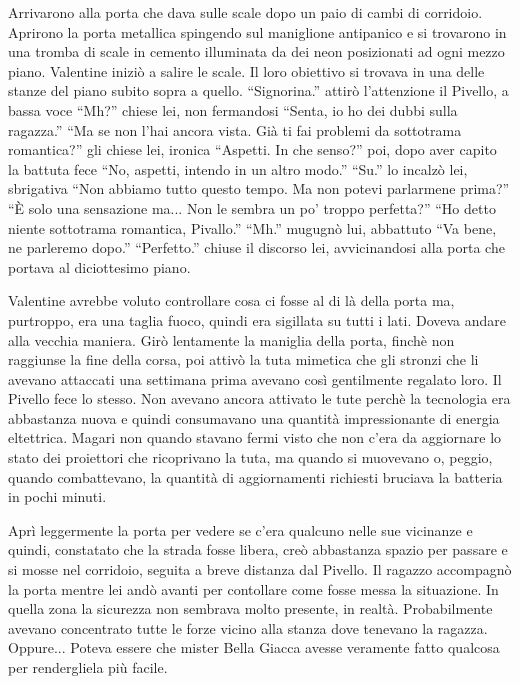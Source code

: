     Arrivarono alla porta che dava sulle scale dopo un paio di cambi di corridoio. Aprirono la porta metallica spingendo
    sul maniglione antipanico e si trovarono in una tromba di scale in cemento illuminata da dei neon posizionati ad
    ogni mezzo piano. Valentine iniziò a salire le scale. Il loro obiettivo si trovava in una delle stanze del piano
    subito sopra a quello. ``Signorina.'' attirò l'attenzione il Pivello, a bassa voce ``Mh?'' chiese lei, non
    fermandosi ``Senta, io ho dei dubbi sulla ragazza.'' ``Ma se non l'hai ancora vista. Già ti fai problemi da
    sottotrama romantica?'' gli chiese lei, ironica ``Aspetti. In che senso?'' poi, dopo aver capito la battuta fece
    ``No, aspetti, intendo in un altro modo.'' ``Su.'' lo incalzò lei, sbrigativa ``Non abbiamo tutto questo tempo. Ma
    non potevi parlarmene prima?'' ``È solo una sensazione ma... Non le sembra un po' troppo perfetta?'' ``Ho detto
    niente sottotrama romantica, Pivallo.'' ``Mh.'' mugugnò lui, abbattuto ``Va bene, ne parleremo dopo.'' ``Perfetto.''
    chiuse il discorso lei, avvicinandosi alla porta che portava al diciottesimo piano.

    Valentine avrebbe voluto controllare cosa ci fosse al di là della porta ma, purtroppo, era una taglia fuoco, quindi
    era sigillata su tutti i lati. Doveva andare alla vecchia maniera. Girò lentamente la maniglia della porta, finchè
    non raggiunse la fine della corsa, poi attivò la tuta mimetica che gli stronzi che li avevano attaccati una
    settimana prima avevano così gentilmente regalato loro. Il Pivello fece lo stesso. Non avevano ancora attivato le
    tute perchè la tecnologia era abbastanza nuova e quindi consumavano una quantità impressionante di energia
    eltettrica. Magari non quando stavano fermi visto che non c'era da aggiornare lo stato dei proiettori che
    ricoprivano la tuta, ma quando si muovevano o, peggio, quando combattevano, la quantità di aggiornamenti richiesti
    bruciava la batteria in pochi minuti.

    Aprì leggermente la porta per vedere se c'era qualcuno nelle sue vicinanze e quindi, constatato che la strada fosse
    libera, creò abbastanza spazio per passare e si mosse nel corridoio, seguita a breve distanza dal Pivello. Il
    ragazzo accompagnò la porta mentre lei andò avanti per contollare come fosse messa la situazione. In quella zona la
    sicurezza non sembrava molto presente, in realtà. Probabilmente avevano concentrato tutte le forze vicino alla
    stanza dove tenevano la ragazza. Oppure... Poteva essere che mister Bella Giacca avesse veramente fatto qualcosa per
    rendergliela più facile.

